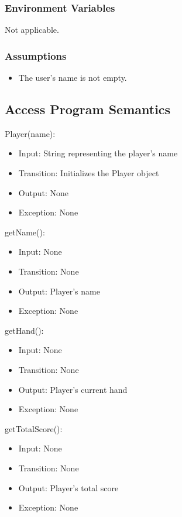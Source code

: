 \documentclass[12pt, titlepage]{article}
\begin{document}
\subsubsection{Environment Variables}
Not applicable.

\subsubsection{Assumptions}
\begin{itemize}
    \item The user's name is not empty.
\end{itemize}

\subsection{Access Program Semantics}
\noindent Player(name):
\begin{itemize}
    \item Input: String representing the player's name
    \item Transition: Initializes the Player object
    \item Output: None
    \item Exception: None
\end{itemize}

\noindent getName():
\begin{itemize}
    \item Input: None
    \item Transition: None
    \item Output: Player's name
    \item Exception: None
\end{itemize}

\noindent getHand():
\begin{itemize}
    \item Input: None
    \item Transition: None
    \item Output: Player's current hand
    \item Exception: None
\end{itemize}

\noindent getTotalScore():
\begin{itemize}
    \item Input: None
    \item Transition: None
    \item Output: Player's total score
    \item Exception: None
\end{itemize}
\end{document}
